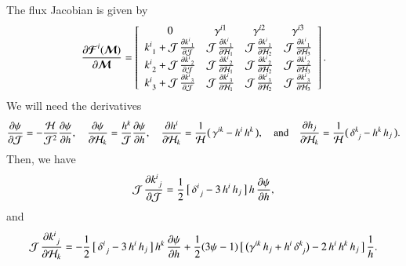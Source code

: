 \documentclass[11pt,letterpaper,twoside,english,final]{article}
\begin{document}
The flux Jacobian is given by
\begin{equation}
  \frac{\partial \boldsymbol{\mathcal{F}}^{i}(\boldsymbol{\mathcal{M}})}{\partial \boldsymbol{\mathcal{M}}}
  =\left[
  \begin{array}{cccc}
    0 & \gamma^{i1} & \gamma^{i2} & \gamma^{i3} \\
    k^{i}_{~1}+\mathcal{J}\,\frac{\partial k^{i}_{~1}}{\partial \mathcal{J}} & \mathcal{J}\,\frac{\partial k^{i}_{~1}}{\partial \mathcal{H}_{1}} & \mathcal{J}\,\frac{\partial k^{i}_{~1}}{\partial \mathcal{H}_{2}} & \mathcal{J}\,\frac{\partial k^{i}_{~1}}{\partial \mathcal{H}_{3}} \\
    k^{i}_{~2}+\mathcal{J}\,\frac{\partial k^{i}_{~2}}{\partial \mathcal{J}} & \mathcal{J}\,\frac{\partial k^{i}_{~2}}{\partial \mathcal{H}_{1}} & \mathcal{J}\,\frac{\partial k^{i}_{~2}}{\partial \mathcal{H}_{2}} & \mathcal{J}\,\frac{\partial k^{i}_{~2}}{\partial \mathcal{H}_{3}} \\
    k^{i}_{~3}+\mathcal{J}\,\frac{\partial k^{i}_{~3}}{\partial \mathcal{J}} & \mathcal{J}\,\frac{\partial k^{i}_{~3}}{\partial \mathcal{H}_{1}} & \mathcal{J}\,\frac{\partial k^{i}_{~3}}{\partial \mathcal{H}_{2}} & \mathcal{J}\,\frac{\partial k^{i}_{~3}}{\partial \mathcal{H}_{3}}
  \end{array}
  \right].  
\end{equation}
We will need the derivatives
\begin{equation}
  \frac{\partial \psi}{\partial \mathcal{J}}=-\frac{\mathcal{H}}{\mathcal{J}^{2}}\frac{\partial \psi}{\partial h},
  \quad
  \frac{\partial \psi}{\partial \mathcal{H}_{k}}=\frac{h^{k}}{\mathcal{J}}\frac{\partial \psi}{\partial h},
  \quad
  \frac{\partial h^{i}}{\partial \mathcal{H}_{k}}
  =\frac{1}{\mathcal{H}}\big(\,\gamma^{ik}-h^{i}\,h^{k}\,\big),
  \quad\text{and}\quad
  \frac{\partial h_{j}}{\partial \mathcal{H}_{k}}
  =\frac{1}{\mathcal{H}}\big(\,\delta^{k}_{~j}-h^{k}\,h_{j}\,\big).
\end{equation}
Then, we have
\begin{equation}
  \mathcal{J}\,\frac{\partial k^{i}_{~j}}{\partial \mathcal{J}}
  =\frac{1}{2}\,\big[\,\delta^{i}_{~j}-3\,h^{i}\,h_{j}\,\big]\,h\,\frac{\partial \psi}{\partial h},
\end{equation}
and
\begin{equation}
  \mathcal{J}\,\frac{\partial k^{i}_{~j}}{\partial \mathcal{H}_{k}}
  =-\frac{1}{2}\,\big[\,\delta^{i}_{~j}-3\,h^{i}\,h_{j}\,\big]\,h^{k}\,\frac{\partial \psi}{\partial h}
  +\frac{1}{2}(3\psi-1)\,\big[\,\big(\gamma^{ik}\,h_{j}+h^{i}\,\delta^{k}_{~j}\big)-2\,h^{i}\,h^{k}\,h_{j}\,\big]\,\frac{1}{h}.  
\end{equation}
\end{document}
